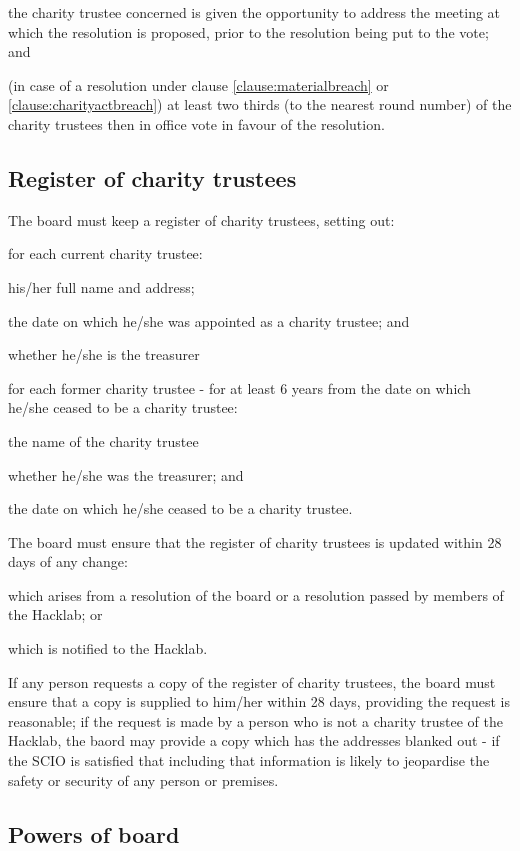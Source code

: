 \documentclass{article}
\begin{document}
\subclause the charity trustee concerned is given the opportunity to
address the meeting at which the resolution is proposed, prior to the
resolution being put to the vote; and

\subclause (in case of a resolution under clause
\ref{clause:materialbreach} or \ref{clause:charityactbreach}) at least
two thirds (to the nearest round number) of the charity trustees then
in office vote in favour of the resolution.

\subsection{Register of charity trustees}

\clause The board must keep a register of charity trustees, setting
out:

\subclause for each current charity trustee:

\subsubclause his/her full name and address;

\subsubclause the date on which he/she was appointed as a charity
trustee; and

\subsubclause whether he/she is the treasurer

\subclause for each former charity trustee - for at least 6 years from
the date on which he/she ceased to be a charity trustee:

\subsubclause the name of the charity trustee

\subsubclause whether he/she was the treasurer; and

\subsubclause the date on which he/she ceased to be a charity trustee.

\clause The board must ensure that the register of charity trustees is
updated within 28 days of any change:

\subclause which arises from a resolution of the board or a resolution
passed by members of the Hacklab; or

\subclause which is notified to the Hacklab.

\clause If any person requests a copy of the register of charity
trustees, the board must ensure that a copy is supplied to him/her
within 28 days, providing the request is reasonable; if the request is
made by a person who is not a charity trustee of the Hacklab, the
baord may provide a copy which has the addresses blanked out - if the
SCIO is satisfied that including that information is likely to
jeopardise the safety or security of any person or premises.

\subsection{Powers of board}
\end{document}

